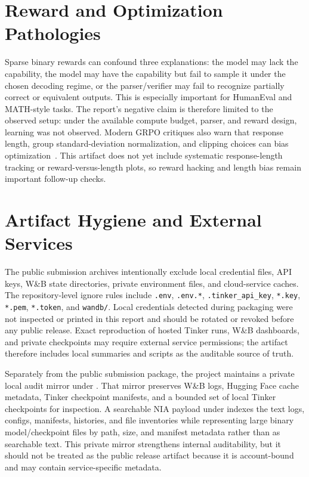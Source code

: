 \documentclass[12pt,a4paper]{report}
\begin{document}
\section*{Reward and Optimization Pathologies}
Sparse binary rewards can confound three explanations: the model may lack the capability, the model may have the capability but fail to sample it under the chosen decoding regime, or the parser/verifier may fail to recognize partially correct or equivalent outputs. This is especially important for HumanEval and MATH-style tasks. The report's negative claim is therefore limited to the observed setup: under the available compute budget, parser, and reward design, learning was not observed. Modern GRPO critiques also warn that response length, group standard-deviation normalization, and clipping choices can bias optimization~\citep{liu2025understanding}. This artifact does not yet include systematic response-length tracking or reward-versus-length plots, so reward hacking and length bias remain important follow-up checks.

\section*{Artifact Hygiene and External Services}
The public submission archives intentionally exclude local credential files, API keys, W\&B state directories, private environment files, and cloud-service caches. The repository-level ignore rules include \texttt{.env}, \texttt{.env.*}, \texttt{.tinker\_api\_key}, \texttt{*.key}, \texttt{*.pem}, \texttt{*.token}, and \texttt{wandb/}. Local credentials detected during packaging were not inspected or printed in this report and should be rotated or revoked before any public release. Exact reproduction of hosted Tinker runs, W\&B dashboards, and private checkpoints may require external service permissions; the artifact therefore includes local summaries and scripts as the auditable source of truth.

Separately from the public submission package, the project maintains a private local audit mirror under . That mirror preserves W\&B logs, Hugging Face cache metadata, Tinker checkpoint manifests, and a bounded set of local Tinker checkpoints for inspection. A searchable NIA payload under  indexes the text logs, configs, manifests, histories, and file inventories while representing large binary model/checkpoint files by path, size, and manifest metadata rather than as searchable text. This private mirror strengthens internal auditability, but it should not be treated as the public release artifact because it is account-bound and may contain service-specific metadata.
\end{document}
